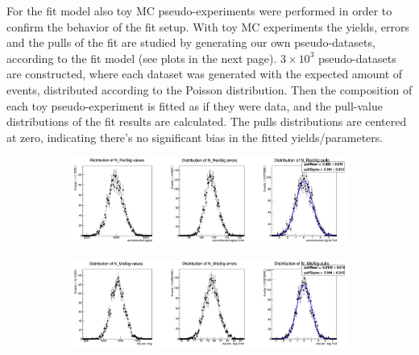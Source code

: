 \noindent For the fit model also toy MC pseudo-experiments were
performed in order to confirm the behavior of the fit setup.  With toy MC experiments the yields, errors and the pulls of the fit are studied  by generating our own pseudo-datasets, according to the fit model (see plots in the next page). 
 $3\times10^3$ pseudo-datasets are constructed, where each dataset was generated with the expected amount of events, distributed according to the Poisson distribution. Then the composition of each toy pseudo-experiment is fitted as if they were data, and the pull-value distributions of the fit results are calculated.
 The pulls distributions are centered at zero, indicating there's no significant bias in the fitted yields/parameters.
\newpage


\begin{figure}[H]
  \begin{subfigure}{14.5cm}
    \centering\includegraphics[width=13.8cm]{04-chargedCorrBtoLambda/figs/NrecSig_mcstudy.png}
  \end{subfigure}
  \begin{subfigure}{14.5cm}
    \centering\includegraphics[width=13.8cm]{04-chargedCorrBtoLambda/figs/NmisSig_mcstudy.png}
  \end{subfigure}
 

\end{figure}
